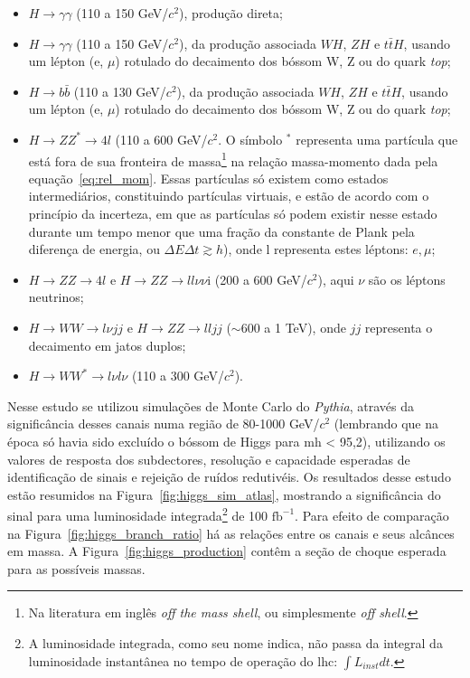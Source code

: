 \begin{itemize}
\item $H\rightarrow\gamma\gamma$ (110 a 150 GeV/$c^2$), produção direta;
\item $H\rightarrow\gamma\gamma$ (110 a 150 GeV/$c^2$), da produção associada $WH$, $ZH$ e
$t\bar{t}H$, usando um lépton (e, $\mu$) rotulado do decaimento dos bóssom W, Z ou
do quark \emph{top};
\item $H\rightarrow b\bar{b}$ (110 a 130 GeV/$c^2$), da produção associada $WH$, $ZH$ e
$t\bar{t}H$, usando um lépton (e, $\mu$) rotulado do decaimento dos bóssom W, Z ou
do quark \emph{top};
\item $H\rightarrow ZZ^*\rightarrow4l$ (110 a 600 GeV/$c^2$. O símbolo $^*$ representa uma partícula 
que está fora de sua fronteira de massa\footnote {Na literatura em inglês 
\emph{off the mass shell}, ou simplesmente \emph{off
shell}.} na relação massa-momento dada pela equação~\ref{eq:rel_mom}. Essas
partículas só existem como estados intermediários, constituindo partículas
virtuais, e estão de acordo com o princípio da incerteza, em que as partículas
só podem existir nesse estado durante um tempo menor que uma fração da
constante 
de Plank pela diferença de energia, ou $\Delta E \Delta t \gtrsim h$), onde l
representa estes léptons: $e,\mu$; 
\item $H\rightarrow ZZ\rightarrow4l$ e $H\rightarrow ZZ\rightarrow ll\nu\nu$i
(200 a 600 GeV/$c^2$), aqui $\nu$ são os léptons neutrinos;
\item $H\rightarrow WW\rightarrow l\nu jj$ e $H\rightarrow ZZ\rightarrow ll jj$
($\sim$600 a 1 TeV),
onde $jj$ representa o decaimento em jatos duplos;
\item $H\rightarrow WW^*\rightarrow l\nu l\nu$ (110 a 300 GeV/$c^2$). 
\end{itemize}


Nesse estudo se utilizou simulações
de Monte Carlo do \emph{Pythia}, através da significância desses 
canais numa região de 80-1000 GeV/$c^2$ (lembrando que na época só havia sido excluído
o bóssom de Higgs para \gls{mh} < 95,2), utilizando os valores de resposta dos
subdectores, resolução e capacidade esperadas de identificação de sinais e rejeição 
de ruídos redutivéis. 
Os resultados desse estudo estão resumidos na Figura~\ref{fig:higgs_sim_atlas},
mostrando a significância do sinal para uma luminosidade integrada\footnote{A 
luminosidade integrada, como seu nome indica, não passa da integral da luminosidade 
instantânea no tempo de operação do \gls{lhc}: $\int{L_{inst} dt}$.} de
100 $\text{fb}^{-1}$. Para efeito de comparação na
Figura~\ref{fig:higgs_branch_ratio} há as relações entre os canais
e seus alcânces em massa. A Figura~\ref{fig:higgs_production} contêm a seção
de choque esperada para as possíveis massas.

